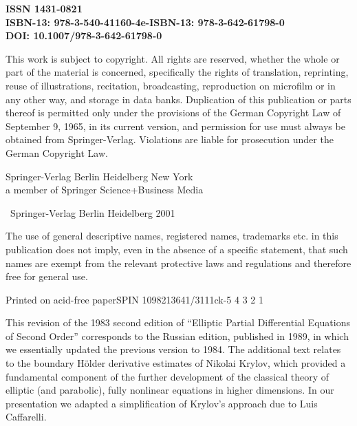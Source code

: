 \noindent\textbf{ISSN 1431-0821}\\
\textbf{ISBN-13: 978-3-540-41160-4}\hfill \textbf{e-ISBN-13: 978-3-642-61798-0}\\
\textbf{DOI: 10.1007/978-3-642-61798-0}

\vspace{2.0em}

\noindent This work is subject to copyright. All rights are reserved, whether the whole or part of the material is
concerned, specifically the rights of translation, reprinting, reuse of illustrations, recitation, broadcasting,
reproduction on microfilm or in any other way, and storage in data banks. Duplication of this publication or
parts thereof is permitted only under the provisions of the German Copyright Law of September 9, 1965, in its
current version, and permission for use must always be obtained from Springer-Verlag. Violations are liable
for prosecution under the German Copyright Law.

\vspace{2.0em}

\noindent Springer-Verlag Berlin Heidelberg New York\\
a member of Springer Science+Business Media

\vspace{1.0em}

\noindent \textcopyright\ Springer-Verlag Berlin Heidelberg 2001

\vspace{2.0em}

\noindent The use of general descriptive names, registered names, trademarks etc. in this publication does not imply,
even in the absence of a specific statement, that such names are exempt from the relevant protective laws and
regulations and therefore free for general use.

\vspace{2.0em}

\noindent Printed on acid-free paper\hfill SPIN 10982136\hfill 41/3111ck-5 4 3 2 1



This revision of the 1983 second edition of ``Elliptic Partial Differential Equations
of Second Order'' corresponds to the Russian edition, published in 1989, in which
we essentially updated the previous version to 1984. The additional text relates to
the boundary H\"older derivative estimates of Nikolai Krylov, which provided a
fundamental component of the further development of the classical theory of
elliptic (and parabolic), fully nonlinear equations in higher dimensions. In
our presentation we adapted a simplification of Krylov's approach due to Luis
Caffarelli.

